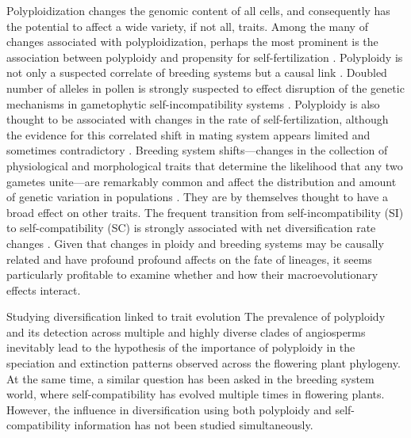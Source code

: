 Polyploidization changes the genomic content of all cells, and consequently has the potential to affect a wide variety, if not all, traits. 
Among the many of changes associated with polyploidization, perhaps the most prominent is the association between polyploidy and propensity for self-fertilization \citep{stebbins1950, barrett1988}.
Polyploidy is not only a suspected correlate of breeding systems but a causal link \citep{stout1942, lewis1947}.
Doubled number of alleles in pollen is strongly suspected to effect disruption of the genetic mechanisms in gametophytic self-incompatibility systems \citep{entani1999, tsukamoto2005, kubo2010}. 
Polyploidy is also thought to be associated with changes in the rate of self-fertilization, although the evidence for this correlated shift in mating system appears limited and sometimes contradictory \citep{barringer2007, barrett2008, husband2008}.
Breeding system shifts---changes in the collection of physiological and morphological traits that determine the likelihood that any two gametes unite---are remarkably common and affect the distribution and amount of genetic variation in populations \citep{stebbins1974,barrett2013}.
They are by themselves thought to have a broad effect on other traits. 
The frequent transition from self-incompatibility (SI) to self-compatibility (SC) is strongly associated with net diversification rate changes \citep{goldberg_2010,devos2014}.
Given that  changes in ploidy and breeding systems may be causally related and have profound profound affects on the fate of lineages, it seems particularly profitable to examine whether and how their macroevolutionary effects interact.
%
%


Studying diversification linked to trait evolution\newline
The prevalence of polyploidy and its detection across multiple and highly diverse clades of angiosperms inevitably lead to the hypothesis of the importance of polyploidy in the speciation and extinction patterns observed across the flowering plant phylogeny. 
At the same time, a similar question has been asked in the breeding system world, where self-compatibility has evolved multiple times in flowering plants. 
However, the influence in diversification using both polyploidy and self-compatibility information has not been studied simultaneously.

